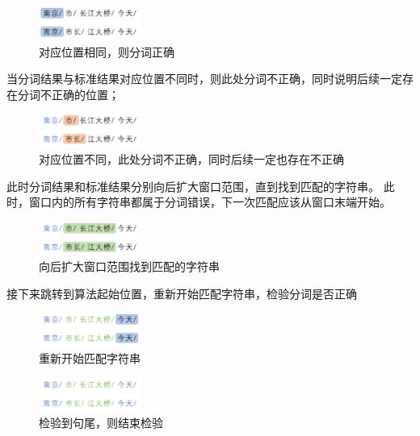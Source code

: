 \begin{figure}[H]
  \centering
  \includegraphics[width=0.3\textwidth]{figures/figure_02.png}
  \caption{对应位置相同，则分词正确}
\end{figure}

当分词结果与标准结果对应位置不同时，则此处分词不正确，同时说明后续一定存在分词不正确的位置；

\begin{figure}[H]
  \centering
  \includegraphics[width=0.3\textwidth]{figures/figure_03.png}
  \caption{对应位置不同，此处分词不正确，同时后续一定也存在不正确}
\end{figure}

此时分词结果和标准结果分别向后扩大窗口范围，直到找到匹配的字符串。
此时，窗口内的所有字符串都属于分词错误，下一次匹配应该从窗口末端开始。

\begin{figure}[H]
  \centering
  \includegraphics[width=0.3\textwidth]{figures/figure_04.png}
  \caption{向后扩大窗口范围找到匹配的字符串}
\end{figure}

接下来跳转到算法起始位置，重新开始匹配字符串，检验分词是否正确

\begin{figure}[H]
  \centering
  \includegraphics[width=0.3\textwidth]{figures/figure_05.png}
  \caption{重新开始匹配字符串}
\end{figure}
\begin{figure}[H]
  \centering
  \includegraphics[width=0.3\textwidth]{figures/figure_06.png}
  \caption{检验到句尾，则结束检验}
\end{figure}

